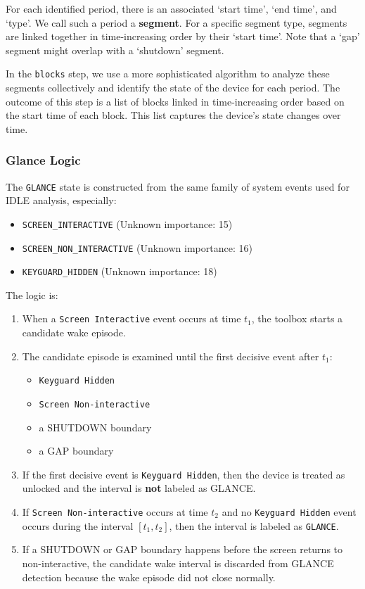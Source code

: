 \documentclass[11pt]{article}
\begin{document}
For each identified period, there is an associated `start time', `end time', and `type'. We call such a period a \textbf{segment}. For a specific segment type, segments are linked together in time-increasing order by their `start time'. Note that a `gap' segment might overlap with a `shutdown' segment.

In the \verb+blocks+ step, we use a more sophisticated algorithm to analyze these segments collectively and identify the state of the device for each period. The outcome of this step is a list of blocks linked in time-increasing order based on the start time of each block. This list captures the device's state changes over time.

\subsubsection{Glance Logic}
The \verb+GLANCE+ state is constructed from the same family of system events used for IDLE analysis, especially:
\begin{itemize}
\item \texttt{SCREEN\_INTERACTIVE} (Unknown importance: 15)
\item \texttt{SCREEN\_NON\_INTERACTIVE} (Unknown importance: 16)
\item \texttt{KEYGUARD\_HIDDEN} (Unknown importance: 18)
\end{itemize}

The logic is:
\begin{enumerate}
\item When a \texttt{Screen Interactive} event occurs at time $t_1$, the toolbox starts a candidate wake episode.
\item The candidate episode is examined until the first decisive event after $t_1$:
\begin{itemize}
\item \texttt{Keyguard Hidden}
\item \texttt{Screen Non-interactive}
\item a SHUTDOWN boundary
\item a GAP boundary
\end{itemize}
\item If the first decisive event is \texttt{Keyguard Hidden}, then the device is treated as unlocked and the interval is \textbf{not} labeled as GLANCE.
\item If \texttt{Screen Non-interactive} occurs at time $t_2$ and no \texttt{Keyguard Hidden} event occurs during the interval $[t_1,t_2]$, then the interval is labeled as \texttt{GLANCE}.
\item If a SHUTDOWN or GAP boundary happens before the screen returns to non-interactive, the candidate wake interval is discarded from GLANCE detection because the wake episode did not close normally.
\end{enumerate}
\end{document}
